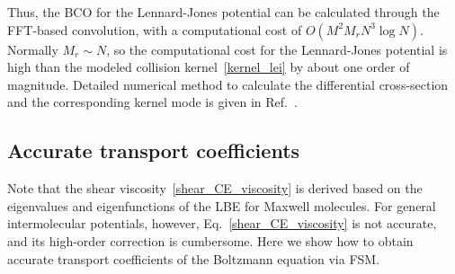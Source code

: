%


Thus, the BCO for the Lennard-Jones potential can be calculated through the FFT-based convolution, with a computational cost of $O(M^2M_rN^3\log{N})$. Normally $M_r\sim N$, so the computational cost for the Lennard-Jones potential is high than the modeled collision kernel~\eqref{kernel_lei} by about one order of magnitude. Detailed numerical method to calculate the differential cross-section and the corresponding kernel mode is given in Ref.~\cite{wuPoF2015}. 


\subsection{Accurate transport coefficients}\label{accurate_transport}


Note that the shear viscosity~\eqref{shear_CE_viscosity} is derived based on the eigenvalues and eigenfunctions of the LBE for Maxwell molecules. For general intermolecular potentials, however, Eq.~\eqref{shear_CE_viscosity} is not accurate, and its high-order correction is cumbersome. Here we show how to obtain accurate transport coefficients of the Boltzmann equation via FSM. 

